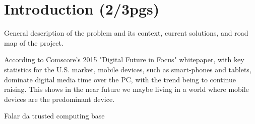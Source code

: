 
% 
% 

\section{Introduction (2/3pgs)}

General description of the problem and its context, current solutions, and road map of the project.

According to Comscore's 2015 "Digital Future in Focus" whitepaper, with key statistics for the U.S. market, mobile devices, such as smart-phones and tablets, dominate digital media time over the PC, with the trend being to continue raising. This shows in the near future we maybe living in a world where mobile devices are the predominant device.

Falar da trusted computing base